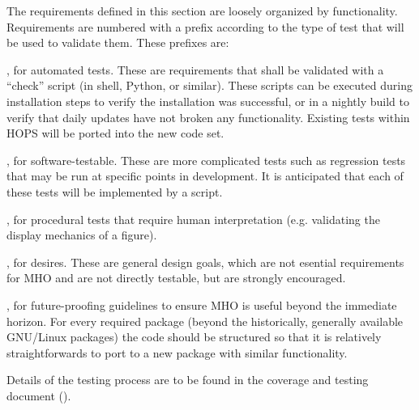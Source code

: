 The requirements defined in this section are loosely organized by functionality.  
Requirements are numbered with a prefix according to
the type of test that will be used to validate them.  These prefixes are:
\begin{description}
[align=left, labelwidth=0.0cm, leftmargin=1cm]
\item[A], for automated tests. These are requirements
that shall be validated with a ``check'' script (in shell, Python, or similar).
These scripts can be executed during installation steps to verify the 
installation was successful, 
or in a nightly build to verify that daily updates have not broken any 
functionality. Existing tests within \ac{HOPS} will be ported into the new 
code set.

\item[S], for software-testable. These are more complicated tests such as 
regression tests that may be run at specific points in development. It is 
anticipated that each of these tests will be implemented by a script.

\item[P], for procedural tests that require human interpretation (e.g. validating
the display mechanics of a figure). 

\item[D], for desires. These are general design goals, which are not 
esential requirements for \acs{MHO} and are not directly testable, 
but are strongly encouraged.

\item[F], for future-proofing guidelines to ensure \acs{MHO} is useful beyond
the immediate horizon. For every required package (beyond the historically, 
generally available GNU/Linux packages) the code should be structured 
so that it is relatively straightforwards to port to a new package with
similar functionality.

\end{description}

Details of the testing process are to be found in the coverage
and testing document (\cite{cover}).




